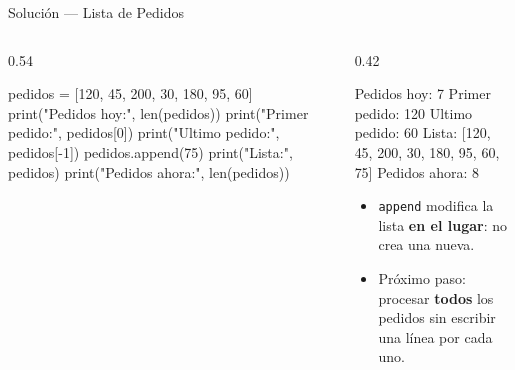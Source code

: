 \documentclass[aspectratio=169, 11pt]{beamer}
\begin{document}
\begin{frame}[fragile,shrink=30]{Solución --- Lista de Pedidos}
  \vspace{-6pt}
  \begin{columns}[T]
    \begin{column}{0.54\textwidth}
      \begin{pyblock}
pedidos = [120, 45, 200, 30, 180, 95, 60]
print("Pedidos hoy:", len(pedidos))
print("Primer pedido:", pedidos[0])
print("Ultimo pedido:", pedidos[-1])
pedidos.append(75)
print("Lista:", pedidos)
print("Pedidos ahora:", len(pedidos))
      \end{pyblock}
    \end{column}

    \begin{column}{0.42\textwidth}
      \vspace{4pt}
      \begin{outputblock}
Pedidos hoy: 7
Primer pedido: 120
Ultimo pedido: 60
Lista: [120, 45, 200, 30, 180, 95, 60, 75]
Pedidos ahora: 8
      \end{outputblock}

      \vspace{4pt}
      {\footnotesize\color{textMuted}
      \begin{itemize}\setlength{\itemsep}{4pt}
        \item[{\color{codeGreen}\scriptsize\faCheck}]
          \texttt{append} modifica la lista
          \textbf{en el lugar}: no crea una nueva.
        \item[{\color{arcaRed}\scriptsize\faLightbulb}]
          Próximo paso: procesar \textbf{todos} los
          pedidos sin escribir una línea
          por cada uno.
      \end{itemize}
      }
    \end{column}
  \end{columns}
\end{frame}
\end{document}
